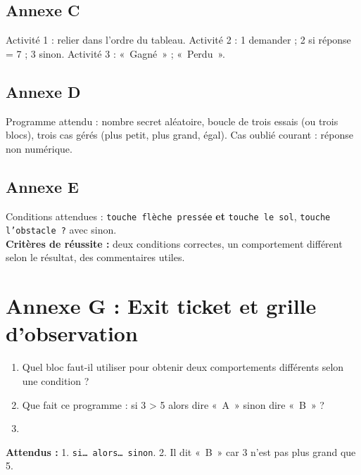 \documentclass[11pt,a4paper]{article}
\begin{document}
\subsection*{Annexe C}
Activité 1 : relier dans l'ordre du tableau. Activité 2 : 1 demander ; 2 si réponse = 7 ; 3 sinon. Activité 3 : «~Gagné~» ; «~Perdu~».

\subsection*{Annexe D}
Programme attendu : nombre secret aléatoire, boucle de trois essais (ou trois blocs), trois cas gérés (plus petit, plus grand, égal). Cas oublié courant : réponse non numérique.

\subsection*{Annexe E}
Conditions attendues : \texttt{touche flèche pressée} \textbf{et} \texttt{touche le sol}, \texttt{touche l'obstacle ?} avec sinon.\\
\textbf{Critères de réussite :} deux conditions correctes, un comportement différent selon le résultat, des commentaires utiles.

\newpage
\section*{Annexe G : Exit ticket et grille d'observation}

\begin{enumerate}
 \item Quel bloc faut-il utiliser pour obtenir deux comportements différents selon une condition ?\\ \lig
 \item Que fait ce programme : si 3 > 5 alors dire «~A~» sinon dire «~B~» ?\\ \lig
 \item \autoeval
\end{enumerate}
\textbf{Attendus :} 1. \texttt{si\ldots{} alors\ldots{} sinon}. 2. Il dit «~B~» car 3 n'est pas plus grand que 5.

\bigskip
{}
\end{document}

